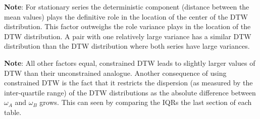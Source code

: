 \documentclass[12pt]{report}
\begin{document}
\begin{table}[!ht]
\begin{tablenotes}
        \item{\footnotesize \textbf{Note}: For stationary series the deterministic component (distance between the mean values) plays the definitive role in the location of the center of the DTW distribution. This factor outweighs the role variance plays in the location of the DTW distribution. A pair with one relatively large variance has a similar DTW distribution than the DTW distribution where both series have large variances.}
        \item{\footnotesize \textbf{Note}: All other factors equal, constrained DTW leads to slightly larger values of DTW than their unconstrained analogue. Another consequence of using constrained DTW is the fact that it restricts the dispersion (as measured by the inter-quartile range) of the DTW distributions as the absolute difference between $\omega_{A}$ and $\omega_{B}$ grows. This can seen by comparing the IQRs the last section of each table.}
    \end{tablenotes}
\end{table}
\end{document}
